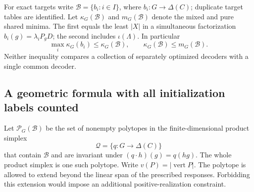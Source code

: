For exact targets write $\mathcal B=\{b_i:i\in I\}$, where
$b_i:G\to\Delta(C)$; duplicate target tables are identified.
Let $\kappa_G(\mathcal B)$ and $m_G(\mathcal B)$ denote the mixed and pure
shared minima.  The first equals the least $|X|$ in a simultaneous
factorization $b_i(g)=\lambda_iP_gD$; the second includes
$\iota(\Lambda)$.  In particular
\[
 \max_i\kappa_G(b_i)\le\kappa_G(\mathcal B),
 \qquad
 \kappa_G(\mathcal B)\le m_G(\mathcal B).
\]
Neither inequality compares a collection of separately optimized decoders
with a single common decoder.

\subsection{A geometric formula with all initialization labels counted}
Let $\mathcal P_G(\mathcal B)$ be the set of nonempty polytopes in the
finite-dimensional product simplex
\[
 \mathcal Q=\{q:G\to\Delta(C)\}
\]
that contain $\mathcal B$ and are invariant under
$(q\cdot h)(g)=q(hg)$.  The whole product simplex is one such polytope.
Write $v(P)=|\operatorname{vert}P|$.  The polytope is allowed to extend
beyond the linear span of the prescribed responses.  Forbidding this
extension would impose an additional positive-realization constraint.

